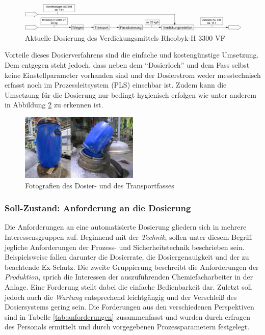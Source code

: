 \begin{figure}[h!]
	\centering
	\includegraphics[width=\textwidth]{img/aktuelle_dosierung}
	\caption{Aktuelle Dosierung des Verdickungsmittels Rheobyk-H 3300 VF}
	\label{fig:aktuelle_dosierung}
\end{figure}
\FloatBarrier

Vorteile dieses Dosierverfahrens sind die einfache und kostengünstige Umsetzung. Dem entgegen steht jedoch, dass neben dem "`Dosierloch"' und dem Fass selbst keine Einstellparameter vorhanden sind und der Dosierstrom weder messtechnisch erfasst noch im Prozessleitsystem (PLS) einsehbar ist. Zudem kann die Umsetzung für die Dosierung nur bedingt hygienisch erfolgen wie unter anderem in Abbildung \ref{fig:dosierfass} zu erkennen ist.

\begin{figure}[h!]
	\centering
	\includegraphics[width=0.5\textwidth]{img/dosierfass}
	\caption{Fotografien des Dosier- und des Transportfasses}
	\label{fig:dosierfass}
\end{figure}
\FloatBarrier

\subsubsection{Soll-Zustand: Anforderung an die Dosierung}
Die Anforderungen an eine automatisierte Dosierung gliedern sich in mehrere Interessensgruppen auf. Beginnend mit der \textit{Technik}, sollen unter diesem Begriff jegliche Anforderungen der Prozess- und Sicherheitstechnik beschrieben sein. Beispielsweise fallen darunter die Dosierrate, die Dosiergenauigkeit und der zu beachtende Ex-Schutz. Die zweite Gruppierung beschreibt die Anforderungen der \textit{Produktion}, sprich die Interessen der auszuführenden Chemiefacharbeiter in der Anlage. Eine Forderung stellt dabei die einfache Bedienbarkeit dar. Zuletzt soll jedoch auch die \textit{Wartung} entsprechend leichtgängig und der Verschleiß des Dosiersystems gering sein. Die Forderungen aus den verschiedenen Perspektiven sind in Tabelle \ref{tab:anforderungen} zusammenfasst und wurden durch erfragen des Personals ermittelt und durch vorgegebenen Prozessparametern festgelegt.

